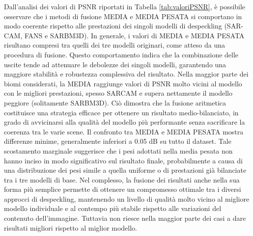 Dall’analisi dei valori di PSNR riportati in Tabella \ref{tab:valoriPSNR}, è possibile osservare che i metodi di fusione 
MEDIA e MEDIA PESATA si comportano in modo coerente rispetto alle prestazioni dei singoli modelli di despeckling (SAR-CAM, FANS e SARBM3D). 
In generale, i valori di MEDIA e MEDIA PESATA risultano compresi tra quelli dei tre modelli originari, come atteso da una procedura di 
fusione. Questo comportamento indica che la combinazione delle uscite tende ad attenuare le debolezze dei singoli modelli, garantendo una 
maggiore stabilità e robustezza complessiva del risultato.
Nella maggior parte dei biomi considerati, la MEDIA raggiunge valori di PSNR molto vicini al modello con le migliori prestazioni, spesso SARCAM e 
supera nettamente il modello peggiore (solitamente SARBM3D). Ciò dimostra che la fusione aritmetica costituisce una strategia efficace per 
ottenere un risultato medio-bilanciato, in grado di avvicinarsi alla qualità del modello più performante senza sacrificare la coerenza tra le varie scene.
Il confronto tra MEDIA e MEDIA PESATA mostra differenze minime, generalmente inferiori a 0.05 dB su tutto il dataset. Tale scostamento 
marginale suggerisce che i pesi adottati nella media pesata non hanno inciso in modo significativo sul risultato finale, probabilmente a 
causa di una distribuzione dei pesi simile a quella uniforme o di prestazioni già bilanciate tra i tre modelli di base.
Nel complesso, la fusione dei risultati anche nella sua forma più semplice permette di ottenere un compromesso ottimale tra i diversi 
approcci di despeckling, mantenendo un livello di qualità molto vicino al migliore modello individuale e al contempo più 
stabile rispetto alle variazioni del contenuto dell’immagine. Tuttavia non riesce nella maggior parte dei casi a dare 
risultati migliori rispetto al miglior modello.

